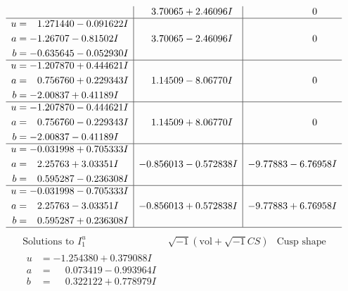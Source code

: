 \documentclass[1p]{elsarticle_modified}
\theoremstyle{definition}
\newcommand{\I}{\sqrt{-1}}
\begin{document}
$$\begin{array}{c|c|c}
 & \phantom{-}3.70065 + 2.46096 I & \phantom{-0.000000 } 0 \\ \hline\begin{aligned}
u &= \phantom{-}1.271440 - 0.091622 I \\
a &= -1.26707 - 0.81502 I \\
b &= -0.635645 - 0.052930 I\end{aligned}
 & \phantom{-}3.70065 - 2.46096 I & \phantom{-0.000000 } 0 \\ \hline\begin{aligned}
u &= -1.207870 + 0.444621 I \\
a &= \phantom{-}0.756760 + 0.229343 I \\
b &= -2.00837 + 0.41189 I\end{aligned}
 & \phantom{-}1.14509 - 8.06770 I & \phantom{-0.000000 } 0 \\ \hline\begin{aligned}
u &= -1.207870 - 0.444621 I \\
a &= \phantom{-}0.756760 - 0.229343 I \\
b &= -2.00837 - 0.41189 I\end{aligned}
 & \phantom{-}1.14509 + 8.06770 I & \phantom{-0.000000 } 0 \\ \hline\begin{aligned}
u &= -0.031998 + 0.705333 I \\
a &= \phantom{-}2.25763 + 3.03351 I \\
b &= \phantom{-}0.595287 - 0.236308 I\end{aligned}
 & -0.856013 - 0.572838 I & -9.77883 - 6.76958 I \\ \hline\begin{aligned}
u &= -0.031998 - 0.705333 I \\
a &= \phantom{-}2.25763 - 3.03351 I \\
b &= \phantom{-}0.595287 + 0.236308 I\end{aligned}
 & -0.856013 + 0.572838 I & -9.77883 + 6.76958 I\\
 \hline 
 \end{array}$$\newpage$$\begin{array}{c|c|c}  
\text{Solutions to }I^u_{1}& \I (\text{vol} + \sqrt{-1}CS) & \text{Cusp shape}\\
 \hline 
\begin{aligned}
u &= -1.254380 + 0.379088 I \\
a &= \phantom{-}0.073419 - 0.993964 I \\
b &= \phantom{-}0.322122 + 0.778979 I\end{aligned}

\end{array}$$
\end{document}
